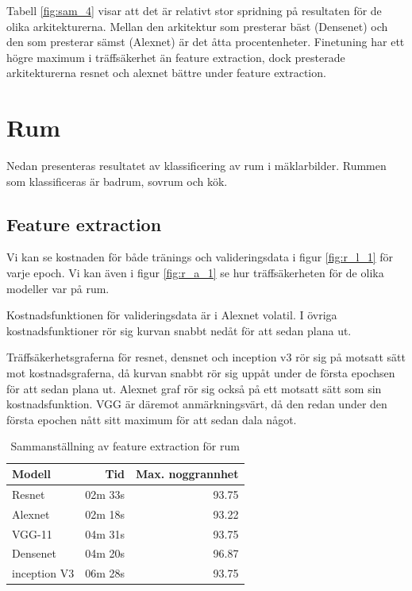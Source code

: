 \documentclass[]{kththesis}
\begin{document}
Tabell \ref{fig:sam_4} visar att det är relativt stor spridning på resultaten för de olika arkitekturerna.
Mellan den arkitektur som presterar bäst (Densenet) och den som presterar sämst (Alexnet) är det åtta procentenheter.
Finetuning har ett högre maximum i träffsäkerhet än feature extraction, dock presterade arkitekturerna resnet och alexnet bättre under feature extraction.

\section{Rum}
Nedan presenteras resultatet av klassificering av rum i mäklarbilder. 
Rummen som klassificeras är badrum, sovrum och kök.


\subsection{Feature extraction}
Vi kan se kostnaden för både tränings och valideringsdata i figur \ref{fig:r_l_1} för varje epoch. 
Vi kan även  i figur \ref{fig:r_a_1} se hur träffsäkerheten för de olika modeller var på rum.

Kostnadsfunktionen för valideringsdata är i Alexnet volatil. 
I övriga kostnadsfunktioner rör sig kurvan snabbt nedåt för att sedan plana ut.

Träffsäkerhetsgraferna för resnet, densnet och inception v3 rör sig på motsatt sätt mot kostnadsgraferna, då kurvan snabbt rör sig uppåt under de första epochsen för att sedan plana ut.
Alexnet graf rör sig också på ett motsatt sätt som sin kostnadsfunktion. 
VGG är däremot anmärkningsvärt, då den redan under den första epochen nått sitt maximum för att sedan dala något.


\begin{table}[!htbp]
  \centering
  \begin{tabular}{|l|r|r|}
    Modell & Tid & Max. noggrannhet \\ 
    \hline
    Resnet       & 02m 33s & 93.75 \\
    Alexnet      & 02m 18s & 93.22 \\
    VGG-11       & 04m 31s & 93.75 \\
    Densenet     & 04m 20s & 96.87 \\
    inception V3 & 06m 28s & 93.75 \\
  \end{tabular}
  \caption{Sammanställning av feature extraction för rum}
  \label{fig:sam_5}    
\end{table}
\end{document}
